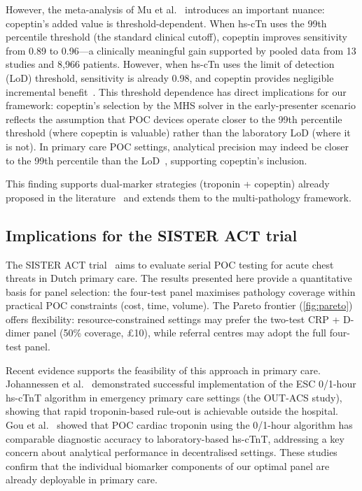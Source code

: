 \documentclass[times, twoside, watermark]{zHenriquesLab-StyleBioRxiv}
\begin{document}
However, the meta-analysis of Mu et al.~\cite{Mu2023} introduces an important nuance: copeptin's added value is threshold-dependent. When hs-cTn uses the 99th percentile threshold (the standard clinical cutoff), copeptin improves sensitivity from 0.89 to 0.96---a clinically meaningful gain supported by pooled data from 13 studies and 8,966 patients. However, when hs-cTn uses the limit of detection (LoD) threshold, sensitivity is already 0.98, and copeptin provides negligible incremental benefit~\cite{Giannitsis2021}. This threshold dependence has direct implications for our framework: copeptin's selection by the MHS solver in the early-presenter scenario reflects the assumption that POC devices operate closer to the 99th percentile threshold (where copeptin is valuable) rather than the laboratory LoD (where it is not). In primary care POC settings, analytical precision may indeed be closer to the 99th percentile than the LoD~\cite{Gou2023}, supporting copeptin's inclusion.

This finding supports dual-marker strategies (troponin + copeptin) already proposed in the literature~\cite{Raskovalova2013} and extends them to the multi-pathology framework.

\subsection*{Implications for the SISTER ACT trial}

The SISTER ACT trial~\cite{SISTERACT2024} aims to evaluate serial POC testing for acute chest threats in Dutch primary care. The results presented here provide a quantitative basis for panel selection: the four-test panel maximises pathology coverage within practical POC constraints (cost, time, volume). The Pareto frontier (\cref{fig:pareto}) offers flexibility: resource-constrained settings may prefer the two-test CRP + D-dimer panel (50\% coverage, \pounds10), while referral centres may adopt the full four-test panel.

Recent evidence supports the feasibility of this approach in primary care. Johannessen et al.~\cite{Johannessen2025} demonstrated successful implementation of the ESC 0/1-hour hs-cTnT algorithm in emergency primary care settings (the OUT-ACS study), showing that rapid troponin-based rule-out is achievable outside the hospital. Gou et al.~\cite{Gou2023} showed that POC cardiac troponin using the 0/1-hour algorithm has comparable diagnostic accuracy to laboratory-based hs-cTnT, addressing a key concern about analytical performance in decentralised settings. These studies confirm that the individual biomarker components of our optimal panel are already deployable in primary care.
\end{document}
